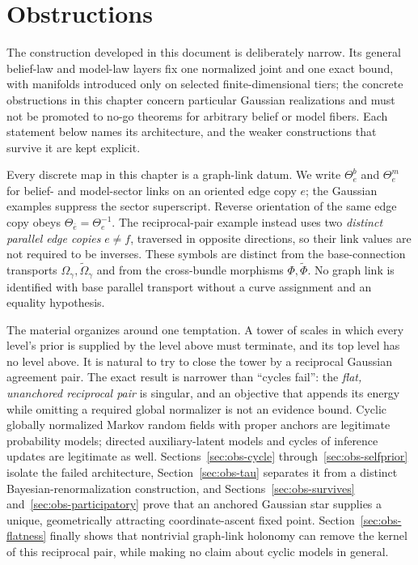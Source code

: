 \chapter{Obstructions}
\label{ch:obstructions}

The construction developed in this document is deliberately narrow. Its general belief-law and model-law layers fix one normalized joint and one exact bound, with manifolds introduced only on selected finite-dimensional tiers; the concrete obstructions in this chapter concern particular Gaussian realizations and must not be promoted to no-go theorems for arbitrary belief or model fibers. Each statement below names its architecture, and the weaker constructions that survive it are kept explicit.

Every discrete map in this chapter is a graph-link datum. We write
\(\Theta^b_e\) and \(\Theta^m_e\) for belief- and model-sector links on an
oriented edge copy \(e\); the Gaussian examples suppress the sector
superscript. Reverse orientation of the same edge copy obeys
\(\Theta_{\bar e}=\Theta_e^{-1}\). The reciprocal-pair example instead uses
two \emph{distinct parallel edge copies} \(e\neq f\), traversed in opposite
directions, so their link values are not required to be inverses. These
symbols are distinct from the base-connection transports
\(\Omega_\gamma,\widetilde\Omega_\gamma\) and from the cross-bundle
morphisms \(\Phi,\widetilde\Phi\). No graph link is identified with base
parallel transport without a curve assignment and an equality hypothesis.

The material organizes around one temptation. A tower of scales in which every level's prior is supplied by the level above must terminate, and its top level has no level above. It is natural to try to close the tower by a reciprocal Gaussian agreement pair. The exact result is narrower than ``cycles fail'': the \emph{flat, unanchored reciprocal pair} is singular, and an objective that appends its energy while omitting a required global normalizer is not an evidence bound. Cyclic globally normalized Markov random fields with proper anchors are legitimate probability models; directed auxiliary-latent models and cycles of inference updates are legitimate as well. Sections~\ref{sec:obs-cycle} through~\ref{sec:obs-selfprior} isolate the failed architecture, Section~\ref{sec:obs-tau} separates it from a distinct Bayesian-renormalization construction, and Sections~\ref{sec:obs-survives} and~\ref{sec:obs-participatory} prove that an anchored Gaussian star supplies a unique, geometrically attracting coordinate-ascent fixed point. Section~\ref{sec:obs-flatness} finally shows that nontrivial graph-link holonomy can remove the kernel of this reciprocal pair, while making no claim about cyclic models in general.

